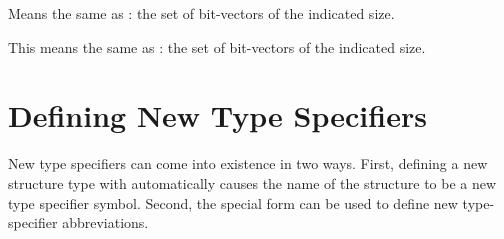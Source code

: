 \begin{flushdesc}
\item[\cd{(bit-vector \emph{size})}]
Means the same as :
the set of bit-vectors of the indicated size.

\item[\cd{(simple-bit-vector \emph{size})}]
This means the same as
: the set of bit-vectors of
the indicated size.
\end{flushdesc}

\section{Defining New Type Specifiers}

New type specifiers can come into existence in two ways.
First, defining a new structure type with  automatically
causes the name of the structure to be a new type specifier symbol.
Second, the  special form can be used to define new type-specifier
abbreviations.

